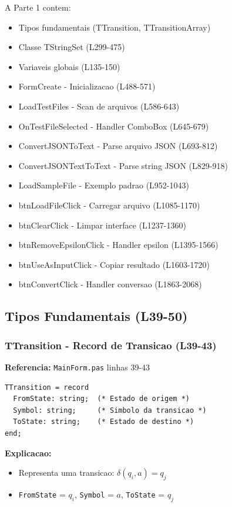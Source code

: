 \documentclass[12pt,a4paper]{article}
\begin{document}
A Parte 1 contem:
\begin{itemize}
    \item Tipos fundamentais (TTransition, TTransitionArray)
    \item Classe TStringSet (L299-475)
    \item Variaveis globais (L135-150)
    \item FormCreate - Inicializacao (L488-571)
    \item LoadTestFiles - Scan de arquivos (L586-643)
    \item OnTestFileSelected - Handler ComboBox (L645-679)
    \item ConvertJSONToText - Parse arquivo JSON (L693-812)
    \item ConvertJSONTextToText - Parse string JSON (L829-918)
    \item LoadSampleFile - Exemplo padrao (L952-1043)
    \item btnLoadFileClick - Carregar arquivo (L1085-1170)
    \item btnClearClick - Limpar interface (L1237-1360)
    \item btnRemoveEpsilonClick - Handler epsilon (L1395-1566)
    \item btnUseAsInputClick - Copiar resultado (L1603-1720)
    \item btnConvertClick - Handler conversao (L1863-2068)
\end{itemize}

\subsection{Tipos Fundamentais (L39-50)}

\subsubsection{TTransition - Record de Transicao (L39-43)}

\textbf{Referencia:} \texttt{MainForm.pas} linhas 39-43

\begin{lstlisting}[style=pascal, caption={Definicao de TTransition}]
TTransition = record
  FromState: string;  (* Estado de origem *)
  Symbol: string;     (* Simbolo da transicao *)
  ToState: string;    (* Estado de destino *)
end;
\end{lstlisting}

\textbf{Explicacao:}
\begin{itemize}
    \item Representa uma transicao: $\delta(q_i, a) = q_j$
    \item \texttt{FromState} = $q_i$, \texttt{Symbol} = $a$, \texttt{ToState} = $q_j$
\end{itemize}
\end{document}
